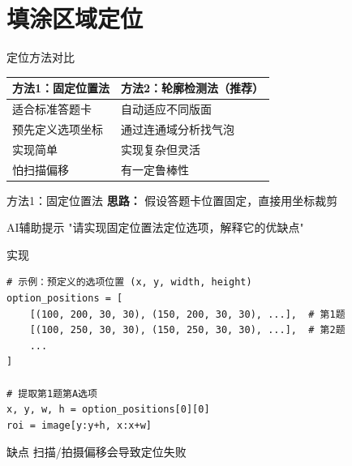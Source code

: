 \section{填涂区域定位}

\begin{frame}{定位方法对比}
    \begin{table}
        \centering
        \begin{tabular}{p{}|p{}}
        \toprule
        \textbf{方法1：固定位置法} & \textbf{方法2：轮廓检测法（推荐）} \\
        \midrule
        适合标准答题卡 & 自动适应不同版面 \\
        预先定义选项坐标 & 通过连通域分析找气泡 \\
        实现简单 & 实现复杂但灵活 \\
        怕扫描偏移 & 有一定鲁棒性 \\
        \bottomrule
        \end{tabular}
    \end{table}
\end{frame}

\begin{frame}{方法1：固定位置法}
    \textbf{思路：} 假设答题卡位置固定，直接用坐标裁剪

    \begin{block}{AI辅助提示}
        \aihint{} "请实现固定位置法定位选项，解释它的优缺点"
    \end{block}

    \begin{block}{实现}
    \begin{lstlisting}
# 示例：预定义的选项位置 (x, y, width, height)
option_positions = [
    [(100, 200, 30, 30), (150, 200, 30, 30), ...],  # 第1题
    [(100, 250, 30, 30), (150, 250, 30, 30), ...],  # 第2题
    ...
]

# 提取第1题第A选项
x, y, w, h = option_positions[0][0]
roi = image[y:y+h, x:x+w]
    \end{lstlisting}
    \end{block}

    \begin{alertblock}{缺点}
    扫描/拍摄偏移会导致定位失败
    \end{alertblock}
\end{frame}

